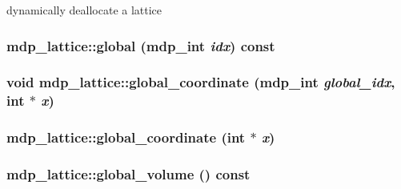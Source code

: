 dynamically deallocate a lattice \hypertarget{classmdp__lattice_a1d7f81c235e6f0259013399f01f98306}{
\subsubsection[{global}]{ mdp\_\-lattice::global ({\bf mdp\_\-int} {\em idx}) const}}
\label{classmdp__lattice_a1d7f81c235e6f0259013399f01f98306}
\hypertarget{classmdp__lattice_af6928ac02766a006f82f6a87eef1019a}{
\subsubsection[{global\_\-coordinate}]{\setlength{\rightskip}{0pt plus 5cm}void mdp\_\-lattice::global\_\-coordinate ({\bf mdp\_\-int} {\em global\_\-idx}, \/  int $\ast$ {\em x})}}
\label{classmdp__lattice_af6928ac02766a006f82f6a87eef1019a}
\hypertarget{classmdp__lattice_a672142cb946fc501ad8ffc7c0ea01c42}{
\subsubsection[{global\_\-coordinate}]{ mdp\_\-lattice::global\_\-coordinate (int $\ast$ {\em x})}}
\label{classmdp__lattice_a672142cb946fc501ad8ffc7c0ea01c42}
\hypertarget{classmdp__lattice_ac1adc4b64acbf07588b58dd0de4dc021}{
\subsubsection[{global\_\-volume}]{ mdp\_\-lattice::global\_\-volume () const}}
\label{classmdp__lattice_ac1adc4b64acbf07588b58dd0de4dc021}



